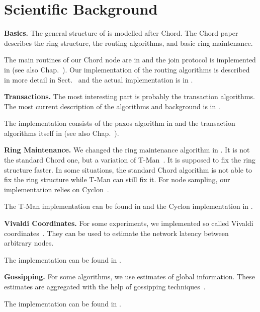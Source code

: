 \section{Scientific Background}

{\bf Basics.} The general structure of \scalaris{} is modelled after
Chord. The Chord paper~\cite{chord-sigcomm} describes the ring
structure, the routing algorithms, and basic ring maintenance.

The main routines of our Chord node are in  and
the join protocol is implemented in  (see
also Chap.~). Our implementation of the routing
algorithms is described in more detail in Sect.~
and the actual implementation is in .

{\bf Transactions.} The most interesting part is probably the
transaction algorithms. The most current description of the algorithms
and background is in \cite{enhanced-paxos}.

The implementation consists of the paxos algorithm in  and
the transaction algorithms itself in  (see also
Chap.~).

{\bf Ring Maintenance.} We changed the ring maintenance algorithm in
\scalaris{}. It is not the standard Chord one, but a variation of
T-Man~\cite{t-man}. It is supposed to fix the ring structure
faster. In some situations, the standard Chord algorithm is not able
to fix the ring structure while T-Man can still fix it. For node sampling,
our implementation relies on Cyclon~\cite{cyclon}.

The T-Man implementation can be found in  and
the Cyclon implementation in .

{\bf Vivaldi Coordinates.} For some experiments, we implemented so
called Vivaldi coordinates~\cite{vivaldi}. They can be used to
estimate the network latency between arbitrary nodes.

The implementation can be found in .

{\bf Gossipping.} For some algorithms, we use estimates of global
information. These estimates are aggregated with the help of
gossipping techniques~\cite{gossip}.

The implementation can be found in .
